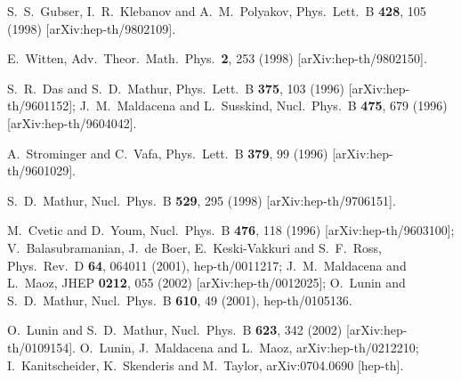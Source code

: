 \documentclass[12pt]{article}
\begin{document}
\begin{thebibliography}{99}
  S.~S.~Gubser, I.~R.~Klebanov and A.~M.~Polyakov,
  Phys.\ Lett.\  B {\bf 428}, 105 (1998)
  [arXiv:hep-th/9802109].

  E.~Witten,
  Adv.\ Theor.\ Math.\ Phys.\  {\bf 2}, 253 (1998)
  [arXiv:hep-th/9802150].

  S.~R.~Das and S.~D.~Mathur,
  Phys.\ Lett.\  B {\bf 375}, 103 (1996)
  [arXiv:hep-th/9601152];
J.~M.~Maldacena and L.~Susskind,
Nucl.\ Phys.\ B {\bf 475}, 679 (1996)
[arXiv:hep-th/9604042].


A.~Strominger and C.~Vafa,
Phys.\ Lett.\ B {\bf 379}, 99 (1996)
[arXiv:hep-th/9601029].
%


S.~D.~Mathur,
Nucl.\ Phys.\ B {\bf 529}, 295 (1998)
[arXiv:hep-th/9706151].
%

M.~Cvetic and D.~Youm,
Nucl.\ Phys.\ B {\bf 476}, 118 (1996)
[arXiv:hep-th/9603100];
V.~Balasubramanian, J.~de Boer, E.~Keski-Vakkuri and S.~F.~Ross,
Phys.\ Rev.\ D {\bf 64}, 064011 (2001), hep-th/0011217;
%
J.~M.~Maldacena and L.~Maoz,
JHEP {\bf 0212}, 055 (2002)
[arXiv:hep-th/0012025];
%
O.~Lunin and S.~D.~Mathur,
Nucl.\ Phys.\ B {\bf 610}, 49 (2001), hep-th/0105136.
%

O.~Lunin and S.~D.~Mathur,
Nucl.\ Phys.\ B {\bf 623}, 342 (2002)
[arXiv:hep-th/0109154].
%
O.~Lunin, J.~Maldacena and L.~Maoz,
arXiv:hep-th/0212210;
%
I.~Kanitscheider, K.~Skenderis and M.~Taylor,
  arXiv:0704.0690 [hep-th].


\end{thebibliography}
\end{document}
